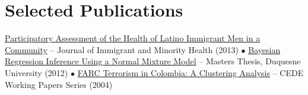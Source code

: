\section{Selected Publications}
\small{\href{https://link.springer.com/article/10.1007/s10903-013-9897-2}{Participatory Assessment of the Health of Latino Immigrant Men in a Community} -- Journal of Immigrant and Minority Health (2013) $\bullet$ \href{https://dsc.duq.edu/cgi/viewcontent.cgi?article=1875&context=etd}{Bayesian Regression Inference Using a Normal Mixture Model} -- Masters Thesis, Duquesne University (2012) $\bullet$ \href{https://repositorio.uniandes.edu.co/server/api/core/bitstreams/041beaed-2964-477b-a77d-cbfa49e9adb3/content}{FARC Terrorism in Colombia: A Clustering Analysis} -- CEDE Working Papers Series (2004)}
\vspace{-8pt}
